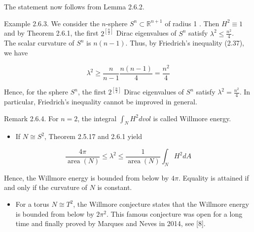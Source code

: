 \documentclass[10pt, letterpaper]{article}
\begin{document}
The statement now follows from Lemma 2.6.2.

Example 2.6.3. We consider the $n$-sphere $S^{n} \subset \mathbb{R}^{n+1}$ of radius 1 . Then $H^{2} \equiv 1$ and by Theorem 2.6.1, the first $2^{\left[\frac{n}{2}\right]}$ Dirac eigenvalues of $S^{n}$ satisfy $\lambda^{2} \leq \frac{n^{2}}{4}$.\\
The scalar curvature of $S^{n}$ is $n(n-1)$. Thus, by Friedrich's inequality (2.37), we have

$$
\lambda^{2} \geq \frac{n}{n-1} \frac{n(n-1)}{4}=\frac{n^{2}}{4}
$$

Hence, for the sphere $S^{n}$, the first $2^{\left[\frac{n}{2}\right]}$ Dirac eigenvalues of $S^{n}$ satisfy $\lambda^{2}=\frac{n^{2}}{4}$. In particular, Friedrich's inequality cannot be improved in general.

Remark 2.6.4. For $n=2$, the integral $\int_{N} H^{2} d v o l$ is called Willmore energy.

\begin{itemize}
  \item If $N \cong S^{2}$, Theorem 2.5.17 and 2.6.1 yield
\end{itemize}

$$
\frac{4 \pi}{\operatorname{area}(N)} \leq \lambda^{2} \leq \frac{1}{\operatorname{area}(N)} \int_{N} H^{2} d A
$$

Hence, the Willmore energy is bounded from below by $4 \pi$. Equality is attained if and only if the curvature of $N$ is constant.

\begin{itemize}
  \item For a torus $N \cong T^{2}$, the Willmore conjecture states that the Willmore energy is bounded from below by $2 \pi^{2}$. This famous conjecture was open for a long time and finally proved by Marques and Neves in 2014, see [8].
\end{itemize}




\pagebreak
\printbibliography
\end{document}
